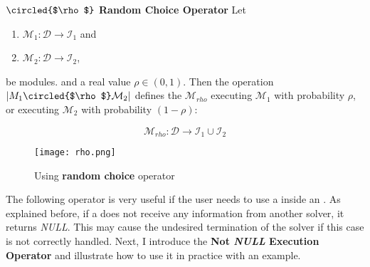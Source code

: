 \begin{definition}\label{op:rho}
$\circled{$\rho$}$ {\bf Random Choice Operator} Let
\begin{enumerate}%
	\item $\mathcal{M}_1 : \mathcal{D} \rightarrow \mathcal{I}_1$ and  
	\item $\mathcal{M}_2 : \mathcal{D} \rightarrow \mathcal{I}_2$,
\end{enumerate}%
be modules. %
and a real value $\rho \in (0,1)$. Then the operation $\left|M_1\circled{$\rho$}\mathcal{M}_2\right|$ defines the \cm{} $\mathcal{M}_{rho}$ executing $\mathcal{M}_1$ with probability $\rho$, or executing $\mathcal{M}_2$ with probability $(1-\rho)$:

\[
\mathcal{M}_{rho}:\mathcal{D} \rightarrow \mathcal{I}_1 \cup \mathcal{I}_2 
\]
\end{definition}


\begin{figure}[h]
	\centering	
	\texttt{[image: rho.png]}
	\caption{Using {\bf random choice} operator}\label{fig:rho_example}
\end{figure}

\separation

The following operator is very useful if the user needs to use a \opch{} inside an \as{}. As explained before, if a \opch{} does not receive any information from another solver, it returns {\it NULL}. This may cause the undesired termination of the solver if this case is not correctly handled. Next, I introduce the \textbf{Not {\it NULL} Execution Operator} and illustrate how to use it in practice with an example.

